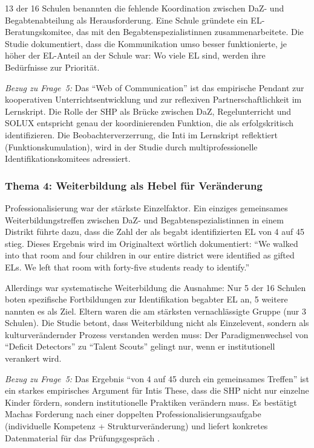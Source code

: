 \documentclass[ngerman, a4paper]{article}
\begin{document}
13 der 16 Schulen benannten die fehlende Koordination zwischen DaZ- und
Begabtenabteilung als Herausforderung. Eine Schule gründete ein
EL-Beratungskomitee, das mit den Begabtenspezialistinnen
zusammenarbeitete. Die Studie dokumentiert, dass die Kommunikation umso
besser funktionierte, je höher der EL-Anteil an der Schule war: Wo viele
EL sind, werden ihre Bedürfnisse zur Priorität.

\textit{Bezug zu Frage~5:} Das \enquote{Web of Communication} ist das
empirische Pendant zur kooperativen Unterrichtsentwicklung
\parencite{buholzer2010allegleich} und zur reflexiven
Partnerschaftlichkeit im Lernskript. Die Rolle der SHP als Brücke
zwischen DaZ, Regelunterricht und SOLUX entspricht genau der
koordinierenden Funktion, die \textcite{gubbins2020promising} als
erfolgskritisch identifizieren. Die Beobachterverzerrung, die Inti im
Lernskript reflektiert (Funktionskumulation), wird in der Studie durch
multiprofessionelle Identifikationskomitees adressiert.

\subsubsection*{Thema 4: Weiterbildung als Hebel für Veränderung}

Professionalisierung war der stärkste Einzelfaktor. Ein einziges
gemeinsames Weiterbildungstreffen zwischen DaZ- und
Begabtenspezialistinnen in einem Distrikt führte dazu, dass die Zahl der
als begabt identifizierten EL von 4 auf 45 stieg. Dieses Ergebnis wird im
Originaltext wörtlich dokumentiert: \enquote{We walked into that room and
four children in our entire district were identified as gifted ELs. We
left that room with forty-five students ready to identify.}

Allerdings war systematische Weiterbildung die Ausnahme: Nur 5 der 16
Schulen boten spezifische Fortbildungen zur Identifikation begabter EL an,
5 weitere nannten es als Ziel. Eltern waren die am stärksten
vernachlässigte Gruppe (nur 3 Schulen). Die Studie betont, dass
Weiterbildung nicht als Einzelevent, sondern als kulturverändernder
Prozess verstanden werden muss: Der Paradigmenwechsel von \enquote{Deficit
Detectors} zu \enquote{Talent Scouts} gelingt nur, wenn er institutionell
verankert wird.

\textit{Bezug zu Frage~5:} Das Ergebnis \enquote{von 4 auf 45 durch ein
gemeinsames Treffen} ist ein starkes empirisches Argument für Intis These,
dass die SHP nicht nur einzelne Kinder fördern, sondern institutionelle
Praktiken verändern muss. Es bestätigt Machas Forderung nach einer
doppelten Professionalisierungsaufgabe (individuelle Kompetenz +
Strukturveränderung) und liefert konkretes Datenmaterial für das
Prüfungsgespräch \parencite{macha2019gender}.
\end{document}
